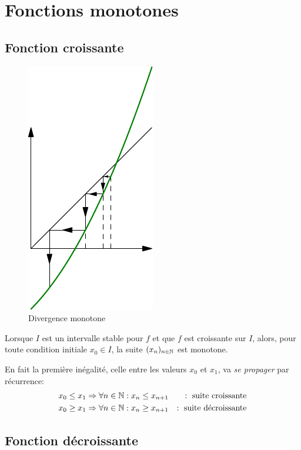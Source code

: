 \section{Fonctions monotones}
\subsection{Fonction croissante}
\begin{figure}[h!t]
 \centering
 \includegraphics{C4792_1.pdf}
 \caption{Divergence monotone}
 \label{fig:C4792_1}
\end{figure}

\begin{prop}
 Lorsque $I$ est un intervalle stable pour $f$ et que $f$ est croissante sur $I$, alors, pour toute condition initiale $x_0\in I$, la suite $(x_n)_{n\in \mathbb{N}}$ est monotone.
\end{prop}
\begin{demo}
 En fait la première inégalité, celle entre les valeurs $x_0$ et $x_1$, va \emph{se propager} par récurrence:
\begin{align*}
 x_0\leq x_1 &\Rightarrow \forall n \in \mathbb{N} : x_n \leq x_{n+1} &:\text{ suite croissante}\\
x_0\geq x_1 &\Rightarrow \forall n \in \mathbb{N} : x_n \geq x_{n+1} &:\text{ suite décroissante}
\end{align*}
\end{demo}
\subsection{Fonction décroissante}
